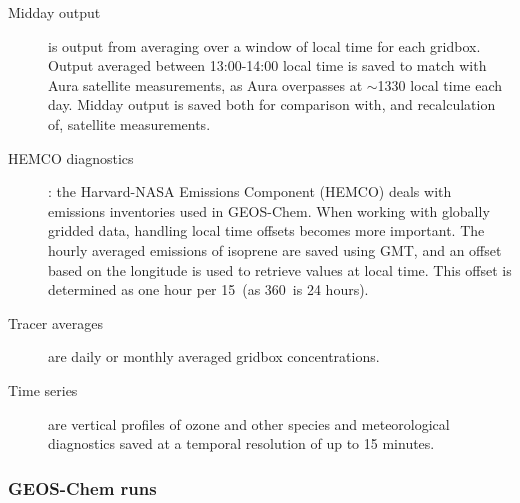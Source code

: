       \begin{description}
        \item[Midday output]%
          is output from averaging over a window of local time for each gridbox. 
          Output averaged between 13:00-14:00 local time is saved to match with Aura satellite measurements, as Aura overpasses at $\sim$1330 local time each day.
          Midday output is saved both for comparison with, and recalculation of, satellite measurements.
        \item[HEMCO diagnostics]:%
          the Harvard-NASA Emissions Component (HEMCO) deals with emissions inventories used in GEOS-Chem.
          When working with globally gridded data, handling local time offsets becomes more important.
          The hourly averaged emissions of isoprene are saved using GMT, and an offset based on the longitude is used to retrieve values at local time.
          This offset is determined as one hour per 15\degr ~(as 360\degr ~is 24 hours).
        \item[Tracer averages]%
          are daily or monthly averaged gridbox concentrations. 
        \item[Time series]%
          are vertical profiles of ozone and other species and meteorological diagnostics saved at a temporal resolution of up to 15 minutes.
        
      \end{description}
    
    \subsubsection{GEOS-Chem runs}
      \label{Model:GC:simulations:runs}
      
